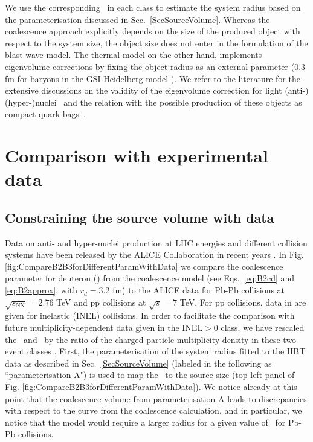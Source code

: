 We use the corresponding \avdNdeta~in each class to estimate the system radius based on the parameterisation discussed in Sec.~\ref{SecSourceVolume}. 
Whereas the coalescence approach
explicitly depends on the size of the produced object with respect to the system size, the object size does not enter in the formulation of the blast-wave model.
The thermal model on the other hand, implements eigenvolume corrections by fixing the object radius as an external parameter %
(0.3 fm for baryons in the GSI-Heidelberg model \cite{Andronic:2017}).
 We refer to the literature for the extensive discussions on the validity of the eigenvolume correction for light (anti-)(hyper-)nuclei~\cite{Vovchenko:2016mwg} and the relation with the possible production of these objects as compact quark bags~\cite{Andronic:2017}.


\section{Comparison with experimental data}\label{sec:comparison}

\subsection{Constraining the source volume with data}\label{sec:radiiParamet}

Data on anti- and hyper-nuclei production at LHC energies and different collision systems have been released by the ALICE Collaboration in recent years \cite{ALICE:nucleipp2017,ALICE:deuteronppPbPb2015,Acharya:2017dmc, Adam:2015yta}. 
In Fig. \ref{fig:CompareB2B3forDifferentParamWithData} we compare the coalescence parameter for deuteron (\btwo) from the coalescence model (see Eqs.~\ref{eq:B2cd} and \ref{eq:B2approx}, with $r_{d} = 3.2$ fm) to the ALICE data for Pb-Pb collisions at $\sqrt{s_{\mathrm{NN}}} = 2.76$ TeV and pp collisions at $\sqrt{s} = 7$ TeV. For pp collisions, data in  \cite{ALICE:nucleipp2017} are given for inelastic (INEL) collisions. In order to facilitate the comparison with future multiplicity-dependent data given in the INEL$>$0 class, we have rescaled the \btwo~and \bthree~by the ratio of the charged particle multiplicity density in these two event classes \cite{Adam:2015gka}.
First, the parameterisation of the system radius fitted to the HBT data as described in Sec.~\ref{SecSourceVolume} (labeled in the following as ``parameterisation A") is used to map the \avdNdeta~to the source size (top left panel of Fig. \ref{fig:CompareB2B3forDifferentParamWithData}). 
We notice already at this point that the coalescence volume from parameterisation A leads to discrepancies with respect to the curve from the coalescence calculation, and in particular, we notice that the model would require a larger radius for a given value of \btwo~for Pb-Pb collisions.


